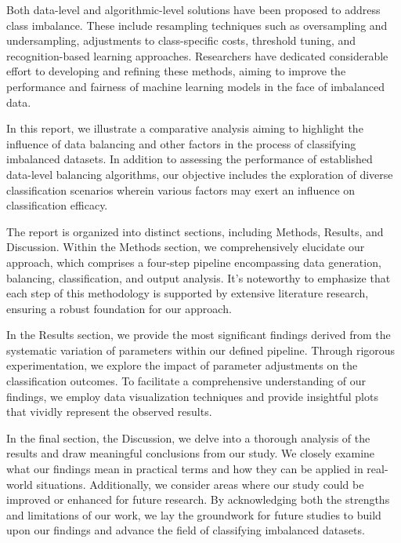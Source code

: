 Both data-level and algorithmic-level solutions have been proposed to address class imbalance.
These include resampling techniques such as oversampling and undersampling, adjustments to class-specific costs, threshold tuning, and recognition-based learning approaches. Researchers have dedicated considerable effort to developing and refining these methods, aiming to improve the performance and fairness of machine learning models in the face of imbalanced data.







In this report, we illustrate a comparative analysis aiming to highlight the influence of data balancing and other factors in the process of classifying imbalanced datasets. In addition to assessing the performance of established data-level balancing algorithms, our objective includes the exploration of diverse classification scenarios wherein various factors may exert an influence on classification efficacy.

The report is organized into distinct sections, including Methods, Results, and Discussion. Within the Methods section, we comprehensively elucidate our approach, which comprises a four-step pipeline encompassing data generation, balancing, classification, and output analysis. It’s noteworthy to emphasize that each step of this methodology is supported by extensive literature research, ensuring a robust foundation for our approach.

In the Results section, we provide the most significant findings derived from the systematic variation of parameters within our defined pipeline. Through rigorous experimentation, we explore the impact of parameter adjustments on the classification outcomes. To facilitate a comprehensive understanding of our findings, we employ data visualization techniques and provide insightful plots that vividly represent the observed results.

In the final section, the Discussion, we delve into a thorough analysis of the results and draw meaningful conclusions from our study. We closely examine what our findings mean in practical terms and how they can be applied in real-world situations. Additionally, we consider areas where our study could be improved or enhanced for future research. By acknowledging both the strengths and limitations of our work, we lay the groundwork for future studies to build upon our findings and advance the field of classifying imbalanced datasets. 



 
